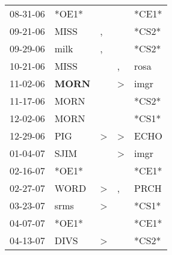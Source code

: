 \begin{supertabular}{p{0.07\textwidth}p{0.06\textwidth}p{0.02\textwidth}p{0.02\textwidth}p{0.06\textwidth}}
          08-31-06\textsuperscript{} &                            *OE1* &                  &                  &                            *CE1* \\
          09-21-06\textsuperscript{} &           MISS\textsuperscript{} &                , &                  &                            *CS2* \\
          09-29-06\textsuperscript{} &           milk\textsuperscript{} &                , &                  &                            *CS2* \\
          10-21-06\textsuperscript{} &           MISS\textsuperscript{} &                  &                , &           rosa\textsuperscript{} \\
          11-02-06\textsuperscript{} &  \textbf{MORN\textsuperscript{}} &                  &     \textgreater &           imgr\textsuperscript{} \\
          11-17-06\textsuperscript{} &           MORN\textsuperscript{} &                  &                  &                            *CS2* \\
          12-02-06\textsuperscript{} &           MORN\textsuperscript{} &                  &                  &                            *CS1* \\
          12-29-06\textsuperscript{} &            PIG\textsuperscript{} &     \textgreater &     \textgreater &           ECHO\textsuperscript{} \\
          01-04-07\textsuperscript{} &           SJIM\textsuperscript{} &                  &     \textgreater &           imgr\textsuperscript{} \\
          02-16-07\textsuperscript{} &                            *OE1* &                  &                  &                            *CE1* \\
          02-27-07\textsuperscript{} &           WORD\textsuperscript{} &     \textgreater &                , &           PRCH\textsuperscript{} \\
          03-23-07\textsuperscript{} &           srms\textsuperscript{} &     \textgreater &                  &                            *CS1* \\
          04-07-07\textsuperscript{} &                            *OE1* &                  &                  &                            *CE1* \\
          04-13-07\textsuperscript{} &           DIVS\textsuperscript{} &     \textgreater &                  &                            *CS2* \\

\end{supertabular}
